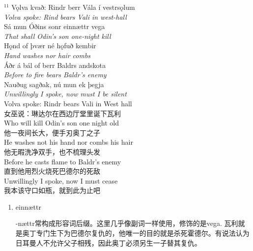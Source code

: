 \begin{paracol}{2}
    \noindent
    $^{11}$ Vǫlva kvað: Rindr berr Vála í vestrsǫlum\\
    \textit{Volva spoke: Rind bears Vali in west-hall}\\
    Sá mun Óðins sonr einnættr vega\\
    \textit{That shall Odin's son one-night kill}\\
    Hǫnd of þvær né hǫfuð kembir\\
    \textit{Hand washes nor hair combs}\\
    Áðr á bál of berr Baldrs andskota\\
    \textit{Before to fire bears Baldr's enemy}\\
    Nauðug sagðak, nú mun ek þegja\\
    \textit{Unwillingly I spoke, now must I be silent}\\
    \switchcolumn
    \noindent
    Volva spoke: Rindr bears Vali in West hall\\
    女巫说：琳达尔在西边厅堂里诞下瓦利\\
    Who will kill Odin's son one night old\\
    他一夜间长大，便手刃奥丁之子\\
    He washes not his hand nor combs his hair\\
    他无暇洗净双手，也不梳理头发\\
    Before he casts flame to Baldr's enemy\\
    直到他用烈火烧死巴德尔的死敌\\
    Unwillingly I spoke, now I must cease\\
    我本该守口如瓶，就到此为止吧\\
\end{paracol}
\begin{grammar*}{}
    \begin{enumerate}[leftmargin=*]
        \item einnættr

              -nættr常构成形容词后缀。这里几乎像副词一样使用，修饰的是vega. 瓦利就是奥丁专门生下为巴德尔复仇的，他唯一的目的就是杀死霍德尔。有说法认为日耳曼人不允许父子相残，因此奥丁必须另生一子替其复仇。
    \end{enumerate}
\end{grammar*}


